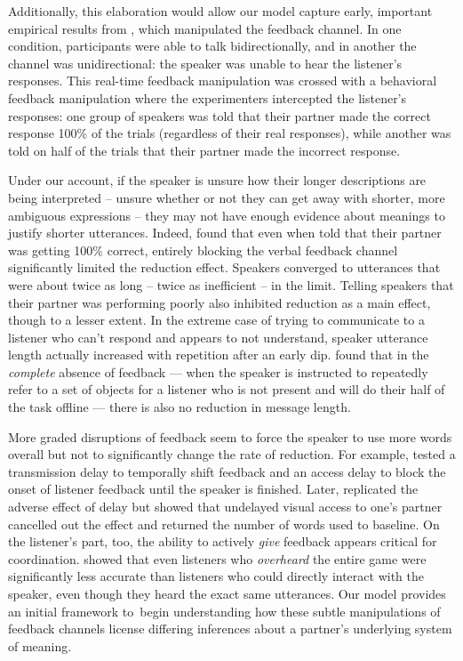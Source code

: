 Additionally, this elaboration would allow our model capture early, important empirical results from , which manipulated the feedback channel.
In one condition, participants were able to talk bidirectionally, and in another the channel was unidirectional: the speaker was unable to hear the listener's responses. 
This real-time feedback manipulation was crossed with a behavioral feedback manipulation where the experimenters intercepted the listener's responses: one group of speakers was told that their partner made the correct response 100\% of the trials (regardless of their real responses), while another was told on half of the trials that their partner made the incorrect response. 

Under our account, if the speaker is unsure how their longer descriptions are being interpreted -- unsure whether or not they can get away with shorter, more ambiguous expressions -- they may not have enough evidence about meanings to justify shorter utterances. 
Indeed,  found that even when told that their partner was getting 100\% correct, entirely blocking the verbal feedback channel significantly limited the reduction effect. 
Speakers converged to utterances that were about twice as long -- twice as inefficient -- in the limit. 
Telling speakers that their partner was performing poorly also inhibited reduction as a main effect, though to a lesser extent. 
In the extreme case of trying to communicate to a listener who can't respond and appears to not understand, speaker utterance length actually increased with repetition after an early dip. 
 found that in the \emph{complete} absence of feedback --- when the speaker is instructed to repeatedly refer to a set of objects for a listener who is not present and will do their half of the task offline --- there is also no reduction in message length. 

More graded disruptions of feedback seem to force the speaker to use more words overall but not to significantly change the rate of reduction. 
For example,  tested a transmission delay to temporally shift feedback and an access delay to block the onset of listener feedback until the speaker is finished. 
Later,  replicated the adverse effect of delay but showed that undelayed visual access to one's partner cancelled out the effect and returned the number of words used to baseline. 
On the listener's part, too, the ability to actively \emph{give} feedback appears critical for coordination. 
 showed that even listeners who \emph{overheard} the entire game were significantly less accurate than listeners who could directly interact with the speaker, even though they heard the exact same utterances.
Our model provides an initial framework to begin understanding how these subtle manipulations of feedback channels license differing inferences about a partner's underlying system of meaning.

